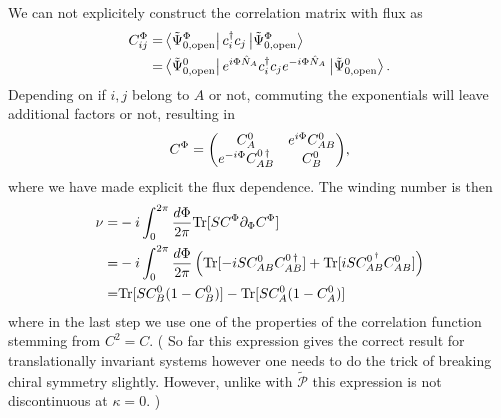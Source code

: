 \documentclass[twocolumn,amsmath,longbibliography,amssymb,superscriptaddress]{revtex4-1}
\newcommand{\carlos}[1]{{\color{red} #1}}
\begin{document}
We can not explicitely construct the correlation matrix with flux as
\begin{align*}
C_{ij}^\Phi =& \bra{\tilde{\Psi}_{0,{\rm open}}^\Phi}c_i^\dagger c_j \ket{\tilde{\Psi}_{0,{\rm open}}^\Phi} \\
=&\bra{\tilde{\Psi}_{0,{\rm open}}^0}e^{i\Phi \hat{N}_A} c_i^\dagger c_j e^{-i\Phi \hat{N}_A}\ket{\tilde{\Psi}_{0,{\rm open}}^0} .
\end{align*}
Depending on if $i,j$ belong to $A$ or not, commuting the exponentials will leave additional factors or not, resulting in
\begin{align*}
C^\Phi = \mqty(C_A^0 & e^{i\Phi} C_{AB}^0 \\e^{-i\Phi} C_{AB}^{0\,\dagger} &C_B^{0}),
\end{align*}
where we have made explicit the flux dependence. The winding number is then
\begin{align}
\nu =&  -i\int_0^{2\pi} \frac{d\Phi}{2\pi} {\rm Tr}[S C^\Phi \partial_\Phi C^\Phi] \\
=&  -i\int_0^{2\pi} \frac{d\Phi}{2\pi} \left( {\rm Tr}[-iS C_{AB}^0 C_{AB}^{0\,\dagger}]+{\rm Tr}[iS C_{AB}^{0\,^\dagger} C_{AB}^0] \right) \\
=&  {\rm Tr}[S C_B^0(1-C_B^0)]-{\rm Tr}[S C_A^0(1-C_A^0)] 
\end{align}
where in the last step we use one of the properties of the correlation function stemming from $C^2 = C$. (\carlos{So far this expression gives the correct result for translationally invariant systems however one needs to do the trick of breaking chiral symmetry slightly. However, unlike with $\tilde{\mathcal{P}}$ this expression is not discontinuous at $\kappa = 0$. })
\end{document}
